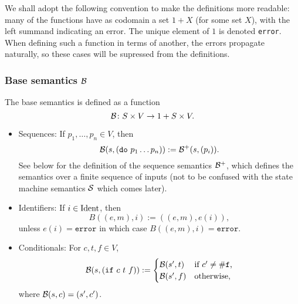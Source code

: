 We shall adopt the following convention to make the definitions more readable:
many of the functions have as codomain a set $1 + X$ (for some set $X$), with
the left summand indicating an error. The unique element of $1$ is denoted
\texttt{error}. When defining such a function in terms of another, the errors
propagate naturally, so these cases will be supressed from the definitions.

\subsubsection{Base semantics $\B$}

The base semantics is defined as a function
\[
\B \colon S \times V \to 1 + S \times V.
\]
\begin{itemize}
\item Sequences: If $p_1, \ldots, p_n \in V$, then
  \[
    \B(s, (\mathtt{do} \ p_1 \ldots p_n)) := \B^+(s, (p_i)).
  \]
  See below for the definition of the sequence semantics $\B^+$, which defines
  the semantics over a finite sequence of inputs (not to be confused with the
  state machine semantics $\S$ which comes later).
\item Identifiers: If $i \in \Ident$, then
  \[
    B((e,m), i) := ((e,m),e(i)),
  \]
  unless $e(i) = \mathtt{error}$ in which case $B((e,m), i) = \mathtt{error}$.
\item Conditionals: For $c,t,f \in V$,
  \[
    \B( s, (\mathtt{if} \ c \ t \ f)) :=
    \begin{cases}
      \B(s', t) & \text{if $c' \neq \mathtt{\#f}$,}\\
      \B(s', f) & \text{otherwise,}
    \end{cases}
  \]
  where $\B(s, c) = (s', c')$.


\end{itemize}
